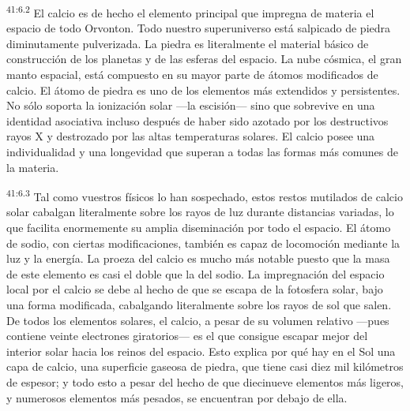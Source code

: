 \par
\textsuperscript{41:6.2} El calcio es de hecho el elemento principal que impregna de materia el espacio de todo Orvonton. Todo nuestro superuniverso está salpicado de piedra diminutamente pulverizada. La piedra es literalmente el material básico de construcción de los planetas y de las esferas del espacio. La nube cósmica, el gran manto espacial, está compuesto en su mayor parte de átomos modificados de calcio. El átomo de piedra es uno de los elementos más extendidos y persistentes. No sólo soporta la ionización solar ---la escisión--- sino que sobrevive en una identidad asociativa incluso después de haber sido azotado por los destructivos rayos X y destrozado por las altas temperaturas solares. El calcio posee una individualidad y una longevidad que superan a todas las formas más comunes de la materia.

\par
\textsuperscript{41:6.3} Tal como vuestros físicos lo han sospechado, estos restos mutilados de calcio solar cabalgan literalmente sobre los rayos de luz durante distancias variadas, lo que facilita enormemente su amplia diseminación por todo el espacio. El átomo de sodio, con ciertas modificaciones, también es capaz de locomoción mediante la luz y la energía. La proeza del calcio es mucho más notable puesto que la masa de este elemento es casi el doble que la del sodio. La impregnación del espacio local por el calcio se debe al hecho de que se escapa de la fotosfera solar, bajo una forma modificada, cabalgando literalmente sobre los rayos de sol que salen. De todos los elementos solares, el calcio, a pesar de su volumen relativo ---pues contiene veinte electrones giratorios--- es el que consigue escapar mejor del interior solar hacia los reinos del espacio. Esto explica por qué hay en el Sol una capa de calcio, una superficie gaseosa de piedra, que tiene casi diez mil kilómetros de espesor; y todo esto a pesar del hecho de que diecinueve elementos más ligeros, y numerosos elementos más pesados, se encuentran por debajo de ella.

